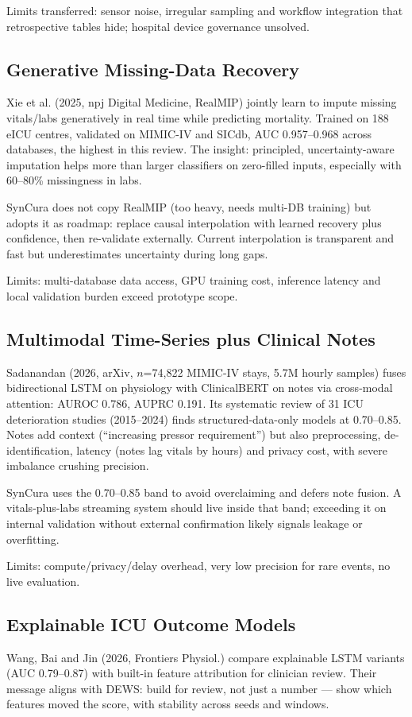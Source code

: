 \documentclass[a4paper,conference]{IEEEtran}
\begin{document}
Limits transferred: sensor noise, irregular sampling and workflow integration that retrospective tables hide; hospital device governance unsolved.

\subsection{Generative Missing-Data Recovery}
Xie et al. (2025, npj Digital Medicine, RealMIP) jointly learn to impute missing vitals/labs generatively in real time while predicting mortality. Trained on 188 eICU centres, validated on MIMIC-IV and SICdb, AUC 0.957--0.968 across databases, the highest in this review. The insight: principled, uncertainty-aware imputation helps more than larger classifiers on zero-filled inputs, especially with 60--80\% missingness in labs.

SynCura does not copy RealMIP (too heavy, needs multi-DB training) but adopts it as roadmap: replace causal interpolation with learned recovery plus confidence, then re-validate externally. Current interpolation is transparent and fast but underestimates uncertainty during long gaps.

Limits: multi-database data access, GPU training cost, inference latency and local validation burden exceed prototype scope.

\subsection{Multimodal Time-Series plus Clinical Notes}
Sadanandan (2026, arXiv, $n$=74,822 MIMIC-IV stays, 5.7M hourly samples) fuses bidirectional LSTM on physiology with ClinicalBERT on notes via cross-modal attention: AUROC 0.786, AUPRC 0.191. Its systematic review of 31 ICU deterioration studies (2015--2024) finds structured-data-only models at 0.70--0.85. Notes add context (``increasing pressor requirement'') but also preprocessing, de-identification, latency (notes lag vitals by hours) and privacy cost, with severe imbalance crushing precision.

SynCura uses the 0.70--0.85 band to avoid overclaiming and defers note fusion. A vitals-plus-labs streaming system should live inside that band; exceeding it on internal validation without external confirmation likely signals leakage or overfitting.

Limits: compute/privacy/delay overhead, very low precision for rare events, no live evaluation.

\subsection{Explainable ICU Outcome Models}
Wang, Bai and Jin (2026, Frontiers Physiol.) compare explainable LSTM variants (AUC 0.79--0.87) with built-in feature attribution for clinician review. Their message aligns with DEWS: build for review, not just a number --- show which features moved the score, with stability across seeds and windows.
\end{document}
